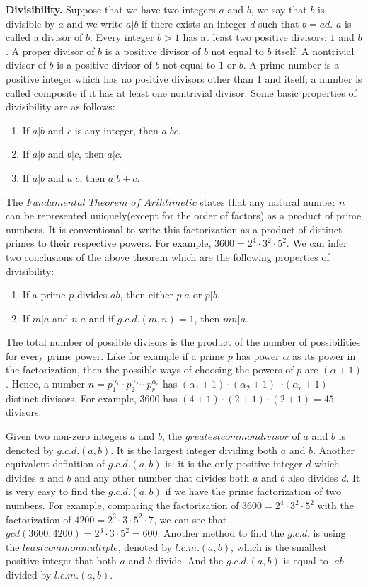 \documentclass[12pt]{article}
\begin{document}
\textbf{Divisibility.} Suppose that we have two integers $a$ and $b$, we say that $b$ is divisible by $a$ and we write $a|b$ if there exists an integer $d$ such that $b=ad$. $a$ is called a divisor of $b$. Every integer $b>1$ has at least two positive divisors: $1$ and $b$. A proper divisor of $b$ is a positive divisor of $b$ not equal to $b$ itself. A nontrivial divisor of $b$ is a positive divisor of $b$ not equal to $1$ or $b$. A prime number is a positive integer which has no positive divisors other than 1 and itself; a number is called composite if it has at least one nontrivial divisor. Some basic properties of divisibility are as follows:
\begin{enumerate}
\item If $a|b$ and $c$ is any integer, then $a|bc$.
\item If $a|b$ and $b|c$, then $a|c$.
\item If $a|b$ and $a|c$, then $a|b\pm c$.
\end{enumerate}
The $Fundamental$ $Theorem$ $of$ $Arihtimetic$ states that any natural number $n$ can be represented uniquely(except for the order of factors) as a product of prime numbers. It is conventional to write this factorization as a product of distinct primes to their respective powers. For example, $3600=2^4 \cdot 3^2 \cdot 5^2$. We can infer two conclusions of the above theorem which are the following properties of divisibility:
\begin{enumerate}
\item If a prime $p$ divides $ab$, then either $p|a$ or $p|b$.
\item If $m|a$ and $n|a$ and if $g.c.d.(m,n)=1$, then $mn|a$.
\end{enumerate}
The total number of possible divisors is the product of the number of possibilities for every prime power. Like for example if a prime $p$ has power $\alpha$ as its power in the factorization, then the possible ways of choosing the powers of $p$ are $(\alpha +1)$. Hence, a number $n = p_1 ^{\alpha_1} \cdot p_2 ^{\alpha_2} \cdots p_r ^{\alpha_r}$ has $(\alpha_1 +1) \cdot (\alpha_2 +1) \cdots (\alpha_r +1)$ distinct divisors. For example, 3600 has $(4+1) \cdot (2+1) \cdot (2+1) = 45$ divisors. \par
Given two non-zero integers $a$ and $b$, the $greatest common divisor$ of $a$ and $b$ is denoted by $g.c.d.(a,b)$. It is the largest integer dividing both $a$ and $b$. Another equivalent definition of $g.c.d.(a,b)$ is: it is the only positive integer $d$ which divides $a$ and $b$ and any other number that divides both $a$ and $b$ also divides $d$. It is very easy to find the $g.c.d.(a,b)$ if we have the prime factorization of two numbers. For example, comparing the factorization of $3600=2^4 \cdot 3^2 \cdot 5^2$ with the factorization of $4200=2^3 \cdot 3 \cdot 5^2 \cdot 7$, we can see that $gcd(3600,4200)=2^3 \cdot 3 \cdot 5^2 = 600$. Another method to find the $g.c.d.$ is using the $least common multiple$, denoted by $l.c.m.(a,b)$, which is the smallest positive integer that both $a$ and $b$ divide. And the $g.c.d.(a,b) $ is equal to $|ab|$ divided by $l.c.m.(a,b)$.
\end{document}
